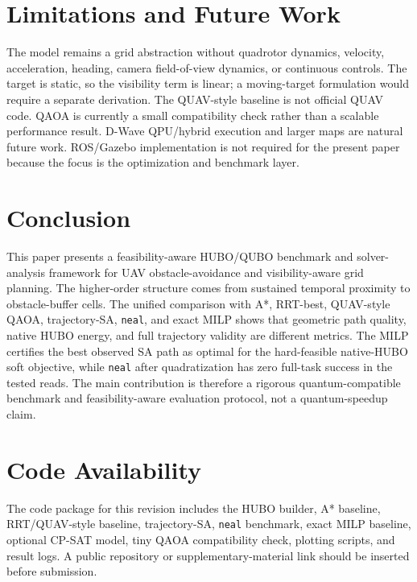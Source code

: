 \documentclass[10pt,conference]{IEEEtran}
\begin{document}
\section{Limitations and Future Work}
The model remains a grid abstraction without quadrotor dynamics, velocity, acceleration, heading, camera field-of-view dynamics, or continuous controls. The target is static, so the visibility term is linear; a moving-target formulation would require a separate derivation. The QUAV-style baseline is not official QUAV code. QAOA is currently a small compatibility check rather than a scalable performance result. D-Wave QPU/hybrid execution and larger maps are natural future work. ROS/Gazebo implementation is not required for the present paper because the focus is the optimization and benchmark layer.

\section{Conclusion}
This paper presents a feasibility-aware HUBO/QUBO benchmark and solver-analysis framework for UAV obstacle-avoidance and visibility-aware grid planning. The higher-order structure comes from sustained temporal proximity to obstacle-buffer cells. The unified comparison with A*, RRT-best, QUAV-style QAOA, trajectory-SA, \texttt{neal}, and exact MILP shows that geometric path quality, native HUBO energy, and full trajectory validity are different metrics. The MILP certifies the best observed SA path as optimal for the hard-feasible native-HUBO soft objective, while \texttt{neal} after quadratization has zero full-task success in the tested reads. The main contribution is therefore a rigorous quantum-compatible benchmark and feasibility-aware evaluation protocol, not a quantum-speedup claim.

\section*{Code Availability}
The code package for this revision includes the HUBO builder, A* baseline, RRT/QUAV-style baseline, trajectory-SA, \texttt{neal} benchmark, exact MILP baseline, optional CP-SAT model, tiny QAOA compatibility check, plotting scripts, and result logs. A public repository or supplementary-material link should be inserted before submission.
\end{document}

